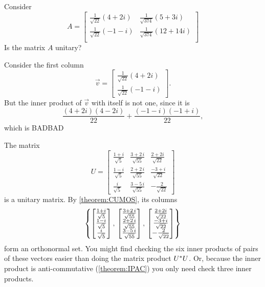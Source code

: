\documentclass{ximera}
\begin{document}
\begin{question}
  Consider
  \[
    A=\begin{bmatrix}
      \frac{1}{\sqrt{22}}\left(4+2i\right) & \frac{1}{\sqrt{374}}\left(5+3i\right) \\
      \frac{1}{\sqrt{22}}\left(-1-i\right) & \frac{1}{\sqrt{374}}\left(12+14i\right) \\
    \end{bmatrix}
  \]
  Is the matrix $A$ unitary?

  \begin{multipleChoice}
  \end{multipleChoice}

  \begin{feedback}[correct]
    Consider the first column
    \[
      \vec{v} = \begin{bmatrix}\frac{1}{\sqrt{22}}\left(4+2i\right) \\
        \frac{1}{\sqrt{22}}\left(-1-i\right) 
    \end{bmatrix}.
    \]
    But the inner product of $\vec{v}$ with itself is not one, since it is
    \[
      \frac{(4+2i)(4-2i)}{22} + \frac{(-1-i)(-1+i)}{22},
    \]
    which is BADBAD
  \end{feedback}
\end{question}

\begin{example}

  The matrix
  \[
    U=
    \begin{bmatrix}
      \frac{1 + i }{{\sqrt{5}}} &
      \frac{3 + 2\,i }{{\sqrt{55}}} &
      \frac{2+2i}{\sqrt{22}} \\
      \frac{1 - i }{{\sqrt{5}}} &
      \frac{2 + 2\,i }{{\sqrt{55}}} &
      \frac{-3 + i }{{\sqrt{22}}} \\
      \frac{i }{{\sqrt{5}}} &
      \frac{3 - 5\,i }{{\sqrt{55}}} &
      -\frac{2}{\sqrt{22}}
    \end{bmatrix}
  \]
  is a unitary matrix.  By \ref{theorem:CUMOS}, its columns
  \[
    \left\{
      \begin{bmatrix}
        \frac{1 + i }{{\sqrt{5}}}\\
        \frac{1 - i }{{\sqrt{5}}}\\
        \frac{i }{{\sqrt{5}}}
      \end{bmatrix},\,
      \begin{bmatrix}
        \frac{3 + 2\,i }{{\sqrt{55}}}\\
        \frac{2 + 2\,i }{{\sqrt{55}}}\\
        \frac{3 - 5\,i }{{\sqrt{55}}}
      \end{bmatrix},\,
      \begin{bmatrix}
        \frac{2+2i}{\sqrt{22}}\\
        \frac{-3 + i }{{\sqrt{22}}}\\
        -\frac{2}{\sqrt{22}}
      \end{bmatrix}
    \right\}
  \]
  form an orthonormal set.  You might find checking the six inner
  products of pairs of these vectors easier than doing the matrix
  product $U^\ast U$.  Or, because the inner product is
  anti-commutative (\ref{theorem:IPAC}) you only need check three
  inner products.
\end{example}
\end{document}
